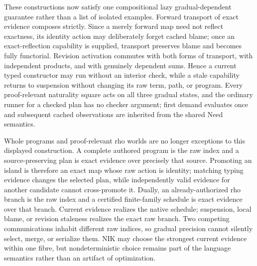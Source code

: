\documentclass[11pt]{article}
\begin{document}
These constructions now satisfy one compositional lazy gradual-dependent
guarantee rather than a list of isolated examples.  Forward transport of exact
evidence composes strictly.  Since a merely forward map need not reflect
exactness, its identity action may deliberately forget cached blame; once an
exact-reflection capability is supplied, transport preserves blame and becomes
fully functorial.  Revision activation commutes with both forms of transport,
with independent products, and with genuinely dependent sums.  Hence a current
typed constructor may run without an interior check, while a stale capability
returns to suspension without changing its raw term, path, or program.  Every
proof-relevant naturality square acts on all three gradual states, and the
ordinary runner for a checked plan has no checker argument; first demand
evaluates once and subsequent cached observations are inherited from the shared
Need semantics.

Whole programs and proof-relevant rho worlds are no longer exceptions to this
displayed construction.  A complete authored program is the raw index and a
source-preserving plan is exact evidence over precisely that source.  Promoting
an island is therefore an exact map whose raw action is identity; matching
typing evidence changes the selected plan, while independently valid evidence
for another candidate cannot cross-promote it.  Dually, an already-authorized
rho branch is the raw index and a certified finite-family schedule is exact
evidence over that branch.  Current evidence realizes the native schedule;
suspension, local blame, or revision staleness realizes the exact raw branch.
Two competing communications inhabit different raw indices, so gradual
precision cannot silently select, merge, or serialize them.  NIK may choose the
strongest current evidence within one fibre, but nondeterministic choice remains
part of the language semantics rather than an artifact of optimization.
\end{document}
